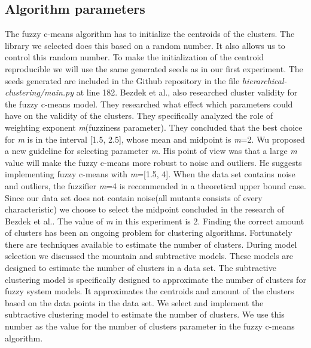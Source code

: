 \documentclass[conference,draftclsnofoot,onecolumn]{IEEEtran}
\begin{document}
\subsection{Algorithm parameters}
The fuzzy c-means algorithm has to initialize the centroids of the clusters.
The library we selected does this based on a random number.
It also allows us to control this random number.
To make the initialization of the centroid reproducible we will use the same generated seeds as in our first experiment.
The seeds generated are included in the Github repository in the file \textit{hierarchical-clustering/main.py} at line 182\cite{rbasarat-repo}.
\newline
Bezdek et al., also researched cluster validity for the fuzzy c-means model\cite{Bezdek1995OnModel}.
They researched what effect which parameters could have on the validity of the clusters.
They specifically analyzed the role of weighting exponent \textit{m}(fuzziness parameter).
They concluded that the best choice for \textit{m} is in the interval [1.5, 2.5], whose mean and midpoint is \textit{m}=2.
Wu proposed a new guideline for selecting parameter \textit{m}\cite{Wu2012}.
His point of view was that a large \textit{m} value will make the fuzzy c-means more robust to noise and outliers.
He suggests implementing fuzzy c-means with \textit{m}=[1.5, 4].
When the data set contains noise and outliers, the fuzzifier \textit{m}=4 is recommended in a theoretical upper bound case.
Since our data set does not contain noise(all mutants consists of every characteristic) we choose to select the midpoint concluded in the research of Bezdek et al.\cite{Bezdek1995OnModel}.
The value of \textit{m} in this experiment is 2.
\newline
Finding the correct amount of clusters has been an ongoing problem for clustering algorithms\cite{Du2010Clustering:Approach}.
Fortunately there are techniques available to estimate the number of clusters.
During model selection we discussed the mountain and subtractive models. 
These models are designed to estimate the number of clusters in a data set.
The subtractive clustering model is specifically designed to approximate the number of clusters for fuzzy system models\cite{Chiu1994FuzzyEstimation}.
It approximates the centroids and amount of the clusters based on the data points in the data set\cite{Chiu1994FuzzyEstimation}.
We select and implement the subtractive clustering model to estimate the number of clusters.
We use this number as the value for the number of clusters parameter in the fuzzy c-means algorithm.
\end{document}
